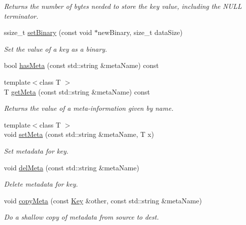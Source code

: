 \begin{DoxyCompactItemize}
\begin{DoxyCompactList}\small\item\em Returns the number of bytes needed to store the key value, including the N\+U\+LL terminator. \end{DoxyCompactList}\item 
ssize\+\_\+t \mbox{\hyperlink{classkdb_1_1Key_af7211129a4b95f4d1e335dcd06e9bf0a}{set\+Binary}} (const void $\ast$new\+Binary, size\+\_\+t data\+Size)
\begin{DoxyCompactList}\small\item\em Set the value of a key as a binary. \end{DoxyCompactList}\item 
bool \mbox{\hyperlink{classkdb_1_1Key_ae3c3228bd66be9013a8d686e57aed64b}{has\+Meta}} (const std\+::string \&meta\+Name) const
\item 
{\footnotesize template$<$class T $>$ }\\T \mbox{\hyperlink{classkdb_1_1Key_acdd4e81b0565756c99826bf926fd6fe4}{get\+Meta}} (const std\+::string \&meta\+Name) const
\begin{DoxyCompactList}\small\item\em Returns the value of a meta-\/information given by name. \end{DoxyCompactList}\item 
{\footnotesize template$<$class T $>$ }\\void \mbox{\hyperlink{classkdb_1_1Key_a4c5a3d463127ade0b766c4298002daa3}{set\+Meta}} (const std\+::string \&meta\+Name, T x)
\begin{DoxyCompactList}\small\item\em Set metadata for key. \end{DoxyCompactList}\item 
void \mbox{\hyperlink{classkdb_1_1Key_a2305da805095605aca38d53f2733fb57}{del\+Meta}} (const std\+::string \&meta\+Name)
\begin{DoxyCompactList}\small\item\em Delete metadata for key. \end{DoxyCompactList}\item 
void \mbox{\hyperlink{classkdb_1_1Key_a53f6d2196a7f17c4bdc544207bdc5f4c}{copy\+Meta}} (const \mbox{\hyperlink{classkdb_1_1Key}{Key}} \&other, const std\+::string \&meta\+Name)
\begin{DoxyCompactList}\small\item\em Do a shallow copy of metadata from source to dest. \end{DoxyCompactList}\item 

\end{DoxyCompactItemize}
